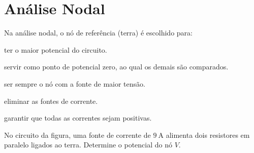 \section{Análise Nodal}

\blocofixacao
\begin{questao}[1]{}

Na análise nodal, o nó de referência (terra) é escolhido para:
\begin{alternativas}
\item ter o maior potencial do circuito.
\item servir como ponto de potencial zero, ao qual os demais são comparados.
\item ser sempre o nó com a fonte de maior tensão.
\item eliminar as fontes de corrente.
\item garantir que todas as correntes sejam positivas.
\end{alternativas}


\end{questao}
\begin{questao}[1]{}

No circuito da figura, uma fonte de corrente de $\SI{9}{\ampere}$ alimenta dois
resistores em paralelo ligados ao terra. Determine o potencial do nó $V$.




\end{questao}

